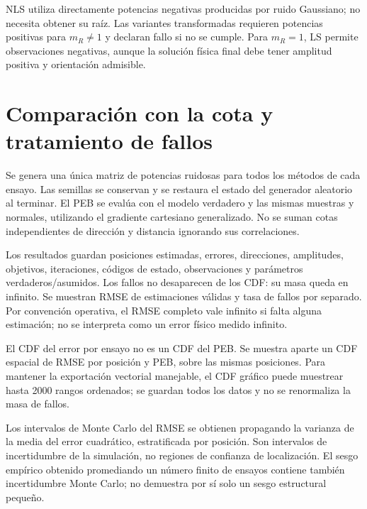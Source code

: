 \documentclass[11pt,a4paper]{article}
\begin{document}
NLS utiliza directamente potencias negativas producidas por ruido Gaussiano; no necesita obtener su raíz. Las variantes transformadas requieren potencias positivas para $m_R\ne1$ y declaran fallo si no se cumple. Para $m_R=1$, LS permite observaciones negativas, aunque la solución física final debe tener amplitud positiva y orientación admisible.

\section{Comparación con la cota y tratamiento de fallos}
Se genera una única matriz de potencias ruidosas para todos los métodos de cada ensayo. Las semillas se conservan y se restaura el estado del generador aleatorio al terminar. El PEB se evalúa con el modelo verdadero y las mismas muestras y normales, utilizando el gradiente cartesiano generalizado. No se suman cotas independientes de dirección y distancia ignorando sus correlaciones.

Los resultados guardan posiciones estimadas, errores, direcciones, amplitudes, objetivos, iteraciones, códigos de estado, observaciones y parámetros verdaderos/asumidos. Los fallos no desaparecen de los CDF: su masa queda en infinito. Se muestran RMSE de estimaciones válidas y tasa de fallos por separado. Por convención operativa, el RMSE completo vale infinito si falta alguna estimación; no se interpreta como un error físico medido infinito.

El CDF del error por ensayo no es un CDF del PEB. Se muestra aparte un CDF espacial de RMSE por posición y PEB, sobre las mismas posiciones. Para mantener la exportación vectorial manejable, el CDF gráfico puede muestrear hasta 2000 rangos ordenados; se guardan todos los datos y no se renormaliza la masa de fallos.

Los intervalos de Monte Carlo del RMSE se obtienen propagando la varianza de la media del error cuadrático, estratificada por posición. Son intervalos de incertidumbre de la simulación, no regiones de confianza de localización. El sesgo empírico obtenido promediando un número finito de ensayos contiene también incertidumbre Monte Carlo; no demuestra por sí solo un sesgo estructural pequeño.
\end{document}
